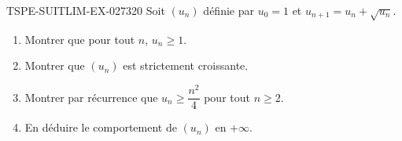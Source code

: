 \begin{exercice}{TSPE-SUITLIM-EX-027}{3}{20}
Soit $(u_n)$ définie par $u_0 = 1$ et $u_{n+1} = u_n + \sqrt{u_n}$.
\begin{enumerate}
  \item Montrer que pour tout $n$, $u_n \geq 1$.
  \item Montrer que $(u_n)$ est strictement croissante.
  \item Montrer par récurrence que $u_n \geq \dfrac{n^2}{4}$ pour tout $n \geq 2$.
  \item En déduire le comportement de $(u_n)$ en $+\infty$.
\end{enumerate}
\end{exercice}
